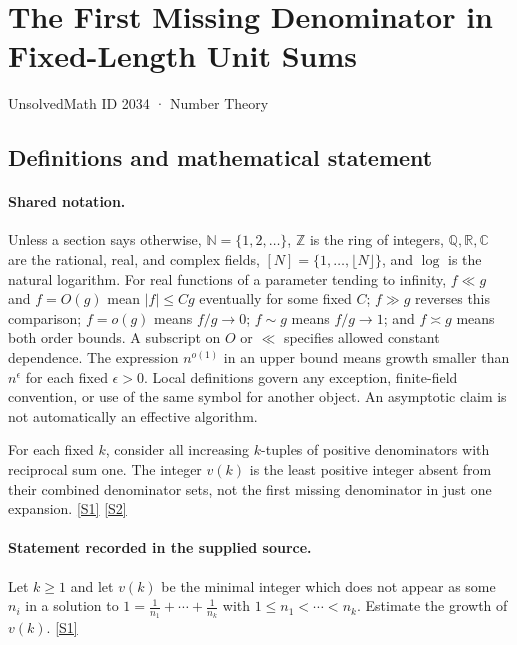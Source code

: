 \documentclass[11pt,a4paper]{article}
\newcommand{\N}{\mathbb{N}}
\newcommand{\Z}{\mathbb{Z}}
\newcommand{\Q}{\mathbb{Q}}
\newcommand{\R}{\mathbb{R}}
\newcommand{\C}{\mathbb{C}}
\newcommand{\sref}[2]{\hyperlink{source:#1:#2}{[S#2]}}
\begin{document}

\setcounter{section}{2033}

\section{The First Missing Denominator in Fixed-Length Unit Sums}\label{2034}

{\small\sffamily UnsolvedMath ID 2034 · Number Theory}

\subsection{Definitions and mathematical statement}

\paragraph{Shared notation.}Unless a section says otherwise, $\N=\{1,2,\ldots\}$,
$\Z$ is the ring of integers, $\Q,\R,\C$ are the rational, real, and complex
fields, $[N]=\{1,\ldots,\lfloor N\rfloor\}$, and $\log$ is the natural
logarithm. For real functions of a parameter tending to infinity,
$f\ll g$ and $f=O(g)$ mean $|f|\leq Cg$ eventually for some fixed $C$;
$f\gg g$ reverses this comparison; $f=o(g)$ means $f/g\to0$;
$f\sim g$ means $f/g\to1$; and $f\asymp g$ means both order bounds.
A subscript on $O$ or $\ll$ specifies allowed constant dependence.
The expression $n^{o(1)}$ in an upper bound means growth smaller than
$n^\epsilon$ for each fixed $\epsilon>0$. Local definitions govern any
exception, finite-field convention, or use of the same symbol for another
object. An asymptotic claim is not automatically an effective algorithm.



For each fixed $k$, consider all increasing $k$-tuples of positive denominators with reciprocal sum one. The integer $v(k)$ is the least positive integer absent from their combined denominator sets, not the first missing denominator in just one expansion. \sref{2034}{1} \sref{2034}{2}

\paragraph{Statement recorded in the supplied source.}
Let $k\geq 1$ and let $v(k)$ be the minimal integer which does not appear as some $n_i$ in a solution to $ 1=\frac{1}{n_1}+\cdots+\frac{1}{n_k} $ with $1\leq n_1<\cdots <n_k$. Estimate the growth of $v(k)$. \sref{2034}{1}
\end{document}

